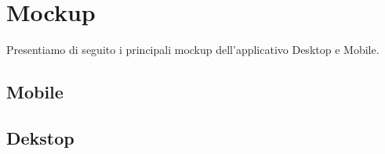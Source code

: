 \section{Mockup}
Presentiamo di seguito i principali mockup dell'applicativo Desktop e Mobile.
\subsection{Mobile}

\subsection{Dekstop}







